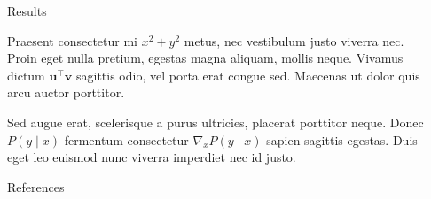\documentclass[final, 20pt]{beamer}
\newlength{\sepwidth}
\newlength{\colwidth}
\newcommand{\separatorcolumn}{\begin{column}{\sepwidth}\end{column}}
\begin{document}
\begin{frame}[t]
\begin{columns}[t]
\begin{column}{\colwidth}
\begin{alertblock}{Results}

    Praesent consectetur mi $x^2 + y^2$ metus, nec vestibulum justo viverra
    nec. Proin eget nulla pretium, egestas magna aliquam, mollis neque. Vivamus
    dictum $\mathbf{u}^\intercal\mathbf{v}$ sagittis odio, vel porta erat
    congue sed. Maecenas ut dolor quis arcu auctor porttitor.


    Sed augue erat, scelerisque a purus ultricies, placerat porttitor neque.
    Donec $P(y \mid x)$ fermentum consectetur $\nabla_x P(y \mid x)$ sapien
    sagittis egestas. Duis eget leo euismod nunc viverra imperdiet nec id
    justo.

    \lipsum[50-51]

  \end{alertblock}

%
%
%

  \begin{block}{References}

    \nocite{*}
    \footnotesize{}

  \end{block}

\end{column}

\separatorcolumn
\end{columns}
\end{frame}
\end{document}

